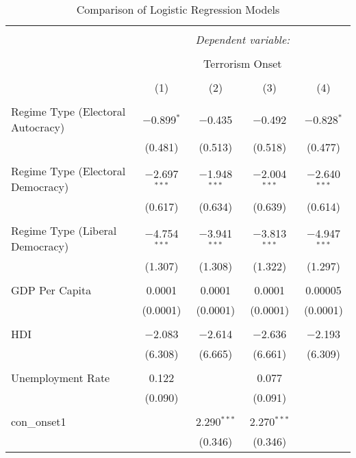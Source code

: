 
\begin{table}[!htbp] \centering 
  \caption{Comparison of Logistic Regression Models} 
  \label{} 
\begin{tabular}{@{\extracolsep{5pt}}lcccc} 
\\[-1.8ex]\hline 
\hline \\[-1.8ex] 
 & \multicolumn{4}{c}{\textit{Dependent variable:}} \\ 
\cline{2-5} 
\\[-1.8ex] & \multicolumn{4}{c}{Terrorism Onset} \\ 
\\[-1.8ex] & (1) & (2) & (3) & (4)\\ 
\hline \\[-1.8ex] 
 Regime Type (Electoral Autocracy) & $-$0.899$^{*}$ & $-$0.435 & $-$0.492 & $-$0.828$^{*}$ \\ 
  & (0.481) & (0.513) & (0.518) & (0.477) \\ 
  & & & & \\ 
 Regime Type (Electoral Democracy) & $-$2.697$^{***}$ & $-$1.948$^{***}$ & $-$2.004$^{***}$ & $-$2.640$^{***}$ \\ 
  & (0.617) & (0.634) & (0.639) & (0.614) \\ 
  & & & & \\ 
 Regime Type (Liberal Democracy) & $-$4.754$^{***}$ & $-$3.941$^{***}$ & $-$3.813$^{***}$ & $-$4.947$^{***}$ \\ 
  & (1.307) & (1.308) & (1.322) & (1.297) \\ 
  & & & & \\ 
 GDP Per Capita & 0.0001 & 0.0001 & 0.0001 & 0.00005 \\ 
  & (0.0001) & (0.0001) & (0.0001) & (0.0001) \\ 
  & & & & \\ 
 HDI & $-$2.083 & $-$2.614 & $-$2.636 & $-$2.193 \\ 
  & (6.308) & (6.665) & (6.661) & (6.309) \\ 
  & & & & \\ 
 Unemployment Rate & 0.122 &  & 0.077 &  \\ 
  & (0.090) &  & (0.091) &  \\ 
  & & & & \\ 
 con\_onset1 &  & 2.290$^{***}$ & 2.270$^{***}$ &  \\ 
  &  & (0.346) & (0.346) &  \\ 

\end{tabular}
\end{table}
